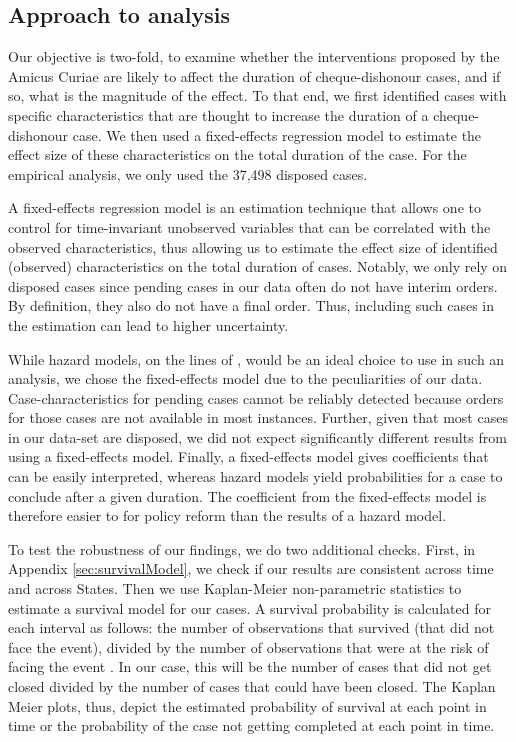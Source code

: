 \subsection{Approach to analysis} \label{sec:approach-analysis}

Our objective is two-fold, to examine whether the interventions proposed by the Amicus Curiae are likely to affect the duration of cheque-dishonour cases, and if so, what is the magnitude of the effect. To that end, we first identified cases with specific characteristics that are thought to increase the duration of a cheque-dishonour case. We then used a fixed-effects regression model to estimate the effect size of these characteristics on the total duration of the case. For the empirical analysis, we only used the 37,498 disposed cases.

A fixed-effects regression model is an estimation technique that allows one to control for time-invariant unobserved variables that can be correlated with the observed characteristics, thus allowing us to estimate the effect size of identified (observed) characteristics on the total duration of cases. Notably, we only rely on disposed cases since pending cases in our data often do not have interim orders. By definition, they also do not have a final order. Thus, including such cases in the estimation can lead to higher uncertainty.

While hazard models, on the lines of \textcite{datta2017_itatDelays}, would be an ideal choice to use in such an analysis, we chose the fixed-effects model due to the peculiarities of our data. Case-characteristics for pending cases cannot be reliably detected because orders for those cases are not available in most instances. Further, given that most cases in our data-set are disposed, we did not expect significantly different results from using a fixed-effects model. Finally, a fixed-effects model gives coefficients that can be easily interpreted, whereas hazard models yield probabilities for a case to conclude after a given duration. The coefficient from the fixed-effects model is therefore easier to for policy reform than the results of a hazard model.

To test the robustness of our findings, we do two additional checks. First, in Appendix \ref{sec:survivalModel}, we check if our results are consistent across time and across States. Then we use Kaplan-Meier non-parametric statistics to estimate a survival model for our cases. A survival probability is calculated for each interval as follows: the number of observations that survived (that did not face the event), divided by the number of observations that were at the risk of facing the event \autocite{rich2010practical}. In our case, this will be the number of cases that did not get closed divided by the number of cases that could have been closed. The Kaplan Meier plots, thus, depict the estimated probability of survival at each point in time or the probability of the case not getting completed at each point in time.

